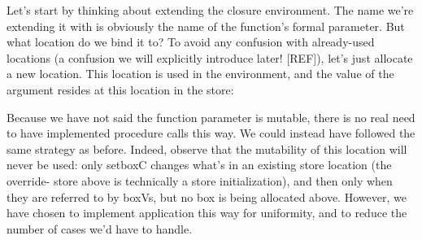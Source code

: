 Let’s start by thinking about extending the closure environment. The name we’re
extending it with is obviously the name of the function’s formal parameter. But
what location do we bind it to? To avoid any confusion with already-used
locations (a confusion we will explicitly introduce later! [REF]), let’s just
allocate a new location. This location is used in the environment, and the value
of the argument resides at this location in the store:

Because we have not said the function parameter is mutable, there is no real
need to have implemented procedure calls this way. We could instead have
followed the same strategy as before. Indeed, observe that the mutability of
this location will never be used: only setboxC changes what’s in an existing
store location (the override- store above is technically a store
initialization), and then only when they are referred to by boxVs, but no box is
being allocated above. However, we have chosen to implement application this way
for uniformity, and to reduce the number of cases we’d have to handle.

